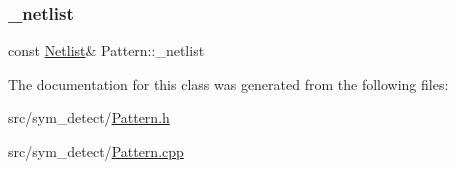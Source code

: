 \subsubsection{\texorpdfstring{\+\_\+netlist}{\_netlist}}
{\footnotesize\ttfamily const \hyperlink{classNetlist}{Netlist}\& Pattern\+::\+\_\+netlist\hspace{0.3cm}{\ttfamily [private]}}



The documentation for this class was generated from the following files\+:\begin{DoxyCompactItemize}
\item 
src/sym\+\_\+detect/\hyperlink{Pattern_8h}{Pattern.\+h}\item 
src/sym\+\_\+detect/\hyperlink{Pattern_8cpp}{Pattern.\+cpp}\end{DoxyCompactItemize}
